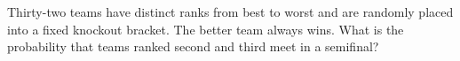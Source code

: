 Thirty-two teams have distinct ranks from best to worst and are randomly placed into a fixed knockout bracket. The better team always wins. What is the probability that teams ranked second and third meet in a semifinal?

